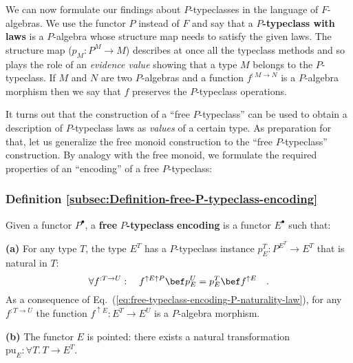 We can now formulate our findings about $P$-typeclasses in the language
of $F$-algebras. We use the functor $P$ instead of $F$ and say
that a $P$\textbf{-typeclass with laws} is
a $P$-algebra whose structure map needs to satisfy the given laws.
The structure map ($p_{M}:P^{M}\rightarrow M$) describes at once
all the typeclass methods and so plays the role of an \emph{evidence
value} showing that a type $M$ belongs to the $P$-typeclass. If
$M$ and $N$ are two $P$-algebras and a function $f^{:M\rightarrow N}$
is a $P$-algebra morphism then we say that $f$ preserves the $P$-typeclass
operations. 

It turns out that the construction of a \textsf{``}free $P$-typeclass\textsf{''}
can be used to obtain a description of $P$-typeclass laws as \emph{values}
of a certain type. As preparation for that, let us generalize the
free monoid construction to the \textsf{``}free $P$-typeclass\textsf{''} construction.
By analogy with the free monoid, we formulate the required properties
of an \textsf{``}encoding\textsf{''} of a free $P$-typeclass:

\subsubsection{Definition \label{subsec:Definition-free-P-typeclass-encoding}\ref{subsec:Definition-free-P-typeclass-encoding}}

Given a functor $P^{\bullet}$, a \textbf{free} $P$\textbf{-typeclass}
\textbf{encoding} is a functor $E^{\bullet}$ such that:

\textbf{(a)} For any type $T$, the type $E^{T}$ has a $P$-typeclass
instance $p_{E}^{T}:P^{E^{T}}\rightarrow E^{T}$ that is natural in
$T$:
\begin{equation}
\forall f^{:T\rightarrow U}:\quad f^{\uparrow E\uparrow P}\bef p_{E}^{U}=p_{E}^{T}\bef f^{\uparrow E}\quad.\label{eq:free-typeclass-encoding-P-naturality-law}
\end{equation}
 As a consequence of Eq.~(\ref{eq:free-typeclass-encoding-P-naturality-law}),
for any $f^{:T\rightarrow U}$ the function $f^{\uparrow E}:E^{T}\rightarrow E^{U}$
is a $P$-algebra morphism.

\textbf{(b)} The functor $E$ is pointed: there exists a natural transformation
$\text{pu}_{E}:\forall T.\,T\rightarrow E^{T}$.

